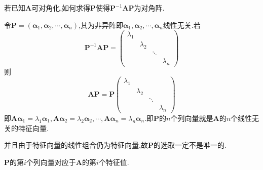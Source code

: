 \begin{brown}
\begin{example}
    若已知$\bm{A}$可对角化,如何求得$\bm{P}$使得$\bm{P}^{-1}\bm{AP}$为对角阵.
\end{example}
\begin{solution}
    令$\bm{P}=\left(
        \bm{\alpha}_1,\bm{\alpha}_2,\cdots,\bm{\alpha}_n
    \right)$,其为非异阵即$\bm{\alpha}_1,
    \bm{\alpha}_2,\cdots,\bm{\alpha}_n$线性无关.若
    \[
    \bm{P}^{-1}\bm{AP}=\begin{pmatrix}
        \lambda_1&&&\\
        &\lambda_2&&\\
        &&\ddots&\\
        &&&\lambda_n
    \end{pmatrix}
    \]则
    \[
    \bm{AP}=
    \bm{P}\begin{pmatrix}
        \lambda_1&&&\\
        &\lambda_2&&\\
        &&\ddots&\\
        &&&\lambda_n
    \end{pmatrix}
    \]即$\bm{A\alpha}_1=\lambda_1\bm{\alpha}_1,
    \bm{A\alpha}_2=\lambda_2\bm{\alpha}_2,\cdots,
    \bm{A\alpha}_n=\lambda_n\bm{\alpha}_n
    $.即$\bm{P}$的$n$个列向量就是$\bm{A}$的$n$个线性无关的特征向量.
    
    并且由于特征向量的线性组合仍为特征向量,故$\bm{P}$的选取一定不是唯一的.
\end{solution}
\end{brown}
\begin{red}
\begin{remark}
    $\bm{P}$的第$i$个列向量对应于$\bm{A}$的第$i$个特征值.
\end{remark}
\end{red}
